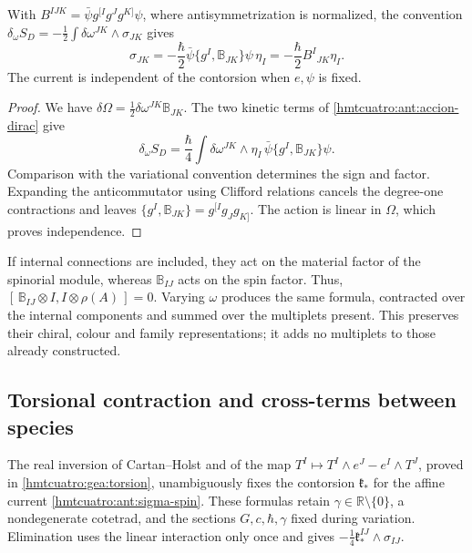 \begin{proposition}
\label{hmtcuatro:ant:corriente-spin} With \(B^{IJK}=\bar\psi g^{[I}g^Jg^{K]}\psi\), where antisymmetrization is normalized, the convention \(\delta_\omega S_D=-\frac12\int\delta\omega^{JK}\wedge\sigma_{JK}\) gives
\begin{equation}
 \sigma_{JK}
 =-\frac{\hbar}{2}\bar\psi\{g^I,\mathbb B_{JK}\}\psi\,\eta_I
 =-\frac{\hbar}{2}B^I{}_{JK}\eta_I .
 \label{hmtcuatro:ant:sigma-spin}
\end{equation}
The current is independent of the contorsion when \(e,\psi\) is fixed.
\end{proposition}
\begin{proof}
We have \(\delta\Omega=\frac12\delta\omega^{JK}\mathbb B_{JK}\). The two kinetic terms of \eqref{hmtcuatro:ant:accion-dirac} give
\[
 \delta_\omega S_D=\frac{\hbar}{4}\int
 \delta\omega^{JK}\wedge\eta_I\,
          \bar\psi\{g^I,\mathbb B_{JK}\}\psi .
\]
Comparison with the variational convention determines the sign and factor. Expanding the anticommutator using Clifford relations cancels the degree-one contractions and leaves \(\{g^I,\mathbb B_{JK}\}=g^{[I}g_Jg_{K]}\). The action is linear in \(\Omega\), which proves independence.
\end{proof}

If internal connections are included, they act on the material factor of the spinorial module, whereas \(\mathbb B_{IJ}\) acts on the spin factor. Thus, \([\,\mathbb B_{IJ}\otimes I,I\otimes\rho(A)\,]=0\). Varying \(\omega\) produces the same formula, contracted over the internal components and summed over the multiplets present. This preserves their chiral, colour and family representations; it adds no multiplets to those already constructed.

\subsection{Torsional contraction and cross-terms between species}
\label{hmtcuatro:ant:contraccion}

The real inversion of Cartan--Holst and of the map \(T^I\mapsto T^I\wedge e^J-e^I\wedge T^J\), proved in \ref{hmtcuatro:gea:torsion}, unambiguously fixes the contorsion \(\mathfrak k_*\) for the affine current \eqref{hmtcuatro:ant:sigma-spin}. These formulas retain \(\gamma\in\mathbb R\setminus\{0\}\), a nondegenerate cotetrad, and the sections \(G,c,\hbar,\gamma\) fixed during variation. Elimination uses the linear interaction only once and gives \(-\frac14\mathfrak k_*^{IJ}\wedge\sigma_{IJ}\).

